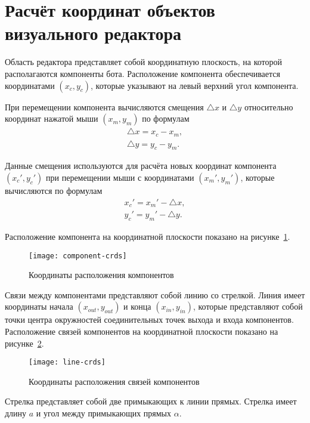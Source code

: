 {
\newpage
\newcommand{\scale}{0.65}

\section{Расчёт координат объектов визуального редактора}


Область редактора представляет собой координатную плоскость,
на которой располагаются компоненты бота.
Расположение компонента обеспечивается координатами $ ( x_c , y_c ) $,
которые указывают
на левый верхний угол компонента.

При перемещении компонента вычисляются смещения
$ \bigtriangleup x $ и $\bigtriangleup y$
относительно координат нажатой мыши
$ (x_m, y_m) $ по формулам
\begin{gather}
	\bigtriangleup x = x_c - x_m, \\
	\bigtriangleup y = y_c - y_m.
\end{gather}

Данные смещения используются для расчёта новых координат компонента
$ (x_c', y_c') $ при перемещении мыши с координатами
$ (x_m', y_m') $,
которые вычисляются по формулам
\begin{gather}
	x_c' = x_m' - \bigtriangleup x, \\
	y_c' = y_m' - \bigtriangleup y.
\end{gather}

Расположение компонента на координатной плоскости показано
на рисунке~\ref{f:component-crds}.

\begin{figure}[h]
	\centering
	\texttt{[image: component-crds]}
	\caption{Координаты расположения компонентов}
	\label{f:component-crds}
\end{figure}

Связи между компонентами представляют собой линию со стрелкой.
Линия имеет координаты начала
$ (x_{out}, y_{out}) $
и конца
$ (x_{in}, y_{in}) $, которые представляют собой точки центра окружностей
соединительных точек выхода и входа компонентов.
Расположение связей компонентов на координатной плоскости показано на
рисунке~\ref{f:line-crds}.

\begin{figure}[h]
	\centering
	\texttt{[image: line-crds]}
	\caption{Координаты расположения связей компонентов}
	\label{f:line-crds}
\end{figure}

Стрелка представляет собой две примыкающих к линии прямых.
Стрелка имеет длину
$ a $ и угол между примыкающих прямых $ \alpha $.

}
